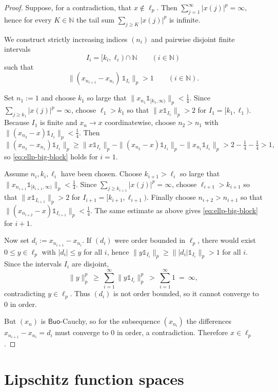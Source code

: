 \documentclass[11pt]{amsart}
\theoremstyle{definition}
\newcommand{\N}{\mathbb{N}}
\newcommand{\Buo}{\ensuremath{\mathsf{Buo}}}
\renewcommand{\le}{\leqslant}
\renewcommand{\ge}{\geqslant}
\begin{document}
\begin{proof}
Suppose, for a contradiction, that $x\notin \ell_p$. Then $\sum_{j=1}^\infty |x(j)|^p=\infty$, hence for every $K\in\N$
the tail sum $\sum_{j\ge K}|x(j)|^p$ is infinite.

We construct strictly increasing indices $(n_i)$ and pairwise disjoint finite intervals
\[
I_i=[k_i,\ell_i)\cap\N \qquad (i\in\N)
\]
such that
\begin{equation}\label{eq:ellp-big-block}
\bigl\|(x_{n_{i+1}}-x_{n_i})\,\mathds1_{I_i}\bigr\|_p>1\qquad(i\in\N).
\end{equation}

Set $n_1:=1$ and choose $k_1$ so large that $\|x_{n_1}\mathds1_{[k_1,\infty)}\|_p<\tfrac14$.
Since $\sum_{j\ge k_1}|x(j)|^p=\infty$, choose $\ell_1>k_1$ so that
$\|x\mathds1_{I_1}\|_p>2$ for $I_1=[k_1,\ell_1)$.
Because $I_1$ is finite and $x_n\to x$ coordinatewise, choose $n_2>n_1$ with
$\|(x_{n_2}-x)\mathds1_{I_1}\|_p<\tfrac14$. Then
\[
\|(x_{n_2}-x_{n_1})\mathds1_{I_1}\|_p
\ge \|x\mathds1_{I_1}\|_p-\|(x_{n_2}-x)\mathds1_{I_1}\|_p-\|x_{n_1}\mathds1_{I_1}\|_p
>2-\tfrac14-\tfrac14>1,
\]
so \eqref{eq:ellp-big-block} holds for $i=1$.

Assume $n_i,k_i,\ell_i$ have been chosen. Choose $k_{i+1}>\ell_i$ so large that
$\|x_{n_{i+1}}\mathds1_{[k_{i+1},\infty)}\|_p<\tfrac14$.
Since $\sum_{j\ge k_{i+1}}|x(j)|^p=\infty$, choose $\ell_{i+1}>k_{i+1}$ so that
$\|x\mathds1_{I_{i+1}}\|_p>2$ for $I_{i+1}=[k_{i+1},\ell_{i+1})$.
Finally choose $n_{i+2}>n_{i+1}$ so that $\|(x_{n_{i+2}}-x)\mathds1_{I_{i+1}}\|_p<\tfrac14$.
The same estimate as above gives \eqref{eq:ellp-big-block} for $i+1$.

Now set $d_i:=x_{n_{i+1}}-x_{n_i}$. If $(d_i)$ were order bounded in $\ell_p$, there would exist $0\le y\in\ell_p$
with $|d_i|\le y$ for all $i$, hence $\|y\mathds1_{I_i}\|_p\ge \||d_i|\mathds1_{I_i}\|_p>1$ for all $i$.
Since the intervals $I_i$ are disjoint,
\[
\|y\|_p^p \ \ge\ \sum_{i=1}^\infty \|y\mathds1_{I_i}\|_p^p \ >\ \sum_{i=1}^\infty 1 \ =\ \infty,
\]
contradicting $y\in\ell_p$. Thus $(d_i)$ is not order bounded, so it cannot converge to $0$ in order.

But $(x_n)$ is \Buo-Cauchy, so for the subsequence $(x_{n_i})$ the differences $x_{n_{i+1}}-x_{n_i}=d_i$
must converge to $0$ in order, a contradiction. Therefore $x\in\ell_p$.
\end{proof}


\section{Lipschitz function spaces}\label{sec:LipX}
\end{document}
